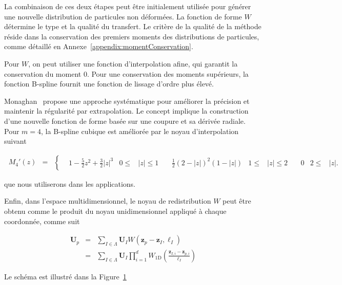 La combinaison de ces deux étapes peut être initialement utilisée pour générer une nouvelle distribution de particules non déformées. La fonction de forme $W$ détermine le type et la qualité du transfert. Le critère de la qualité de la méthode réside dans la conservation des premiers moments des distributions de particules, comme détaillé en Annexe~\ref{appendix:momentConservation}.

Pour $W$, on peut utiliser une fonction d'interpolation afine, qui garantit la conservation du moment 0. Pour une conservation des moments supérieurs, la fonction B-spline fournit une fonction de lissage d'ordre plus élevé.

Monaghan~\cite{monaghan_extrapolating_1985} propose une approche systématique pour améliorer la précision et maintenir la régularité par extrapolation. Le concept implique la construction d'une nouvelle fonction de forme basée sur une coupure et sa dérivée radiale. Pour $m = 4$, la B-spline cubique est améliorée par le noyau d'interpolation suivant

\begin{eqnarray*}~\label{cubic_radial_kernel}
    M_4'(z) &=& \left\{ \begin{aligned}
         & 1 - \frac{5}{2}z^2 + \frac{3}{2} |z|^3 & 0 \leq & |z| \leq 1 & \
         & \frac{1}{2}{(2 - |z|)}^2(1 - |z|)      & 1 \leq & |z| \leq 2 & \
         & 0                                      & 2 \leq & |z|.
    \end{aligned}
    \right.
\end{eqnarray*}

que nous utiliserons dans les applications.

Enfin, dans l'espace multidimensionnel, le noyau de redistribution $W$ peut être obtenu comme le produit du noyau unidimensionnel appliqué à chaque coordonnée, comme suit

\begin{eqnarray*}
    \bm U_p &=& \sum_{I \in \Lambda} \bm U_I W \left(\bm z_p - \bm z_I, \ell_I \right) \\
    &=& \sum_{I \in \Lambda} \bm U_I \prod_{i = 1}^d W_{1\text{D}} \left(\frac{\bm z_{I, i} - \bm z_{p, i}}{\ell_I} \right)
\end{eqnarray*}

Le schéma est illustré dans la Figure~\ref{fig:remaillage}

\begin{figure}~\label{fig:remaillage}
\end{figure}

